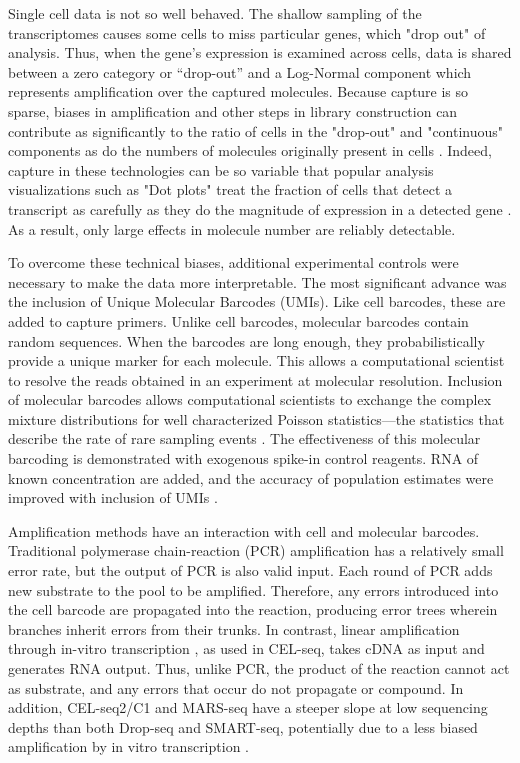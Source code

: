 Single cell data is not so well behaved.
The shallow sampling of the transcriptomes causes some cells to miss particular genes, which "drop out" of analysis. 
Thus, when the gene's expression is examined across cells, data is shared between a zero category or “drop-out” and a Log-Normal component which represents amplification over the captured molecules. 
Because capture is so sparse, biases in amplification and other steps in library construction can contribute as significantly to the ratio of cells in the "drop-out" and "continuous" components as do the numbers of molecules originally present in cells \citep{Zheng2011,Dohm2008}.
Indeed, capture in these technologies can be so variable that popular analysis visualizations such as "Dot plots" treat the fraction of cells that detect a transcript as carefully as they do the magnitude of expression in a detected gene \citep{Shekhar2016}. 
As a result, only large effects in molecule number are reliably detectable. 

To overcome these technical biases, additional experimental controls were necessary to make the data more interpretable. 
The most significant advance was the inclusion of Unique Molecular Barcodes (UMIs). 
Like cell barcodes, these are added to capture primers. 
Unlike cell barcodes, molecular barcodes contain random sequences. 
When the barcodes are long enough, they probabilistically provide a unique marker for each molecule. 
This allows a computational scientist to resolve the reads obtained in an experiment at molecular resolution. 
Inclusion of molecular barcodes allows computational scientists to exchange the complex mixture distributions for well characterized Poisson statistics---the statistics that describe the rate of rare sampling events \citep{Shiroguchi2012}.
The effectiveness of this molecular barcoding is demonstrated with exogenous spike-in control reagents. 
RNA of known concentration are added, and the accuracy of population estimates were improved with inclusion of UMIs \citep{Gruen2014}.

Amplification methods have an interaction with cell and molecular barcodes. 
Traditional polymerase chain-reaction (PCR) amplification has a relatively small error rate, but the output of PCR is also valid input. 
Each round of PCR adds new substrate to the pool to be amplified. 
Therefore, any errors introduced into the cell barcode are propagated into the reaction, producing error trees wherein branches inherit errors from their trunks. 
In contrast, linear amplification through in-vitro transcription \citep{Eberwine1992}, as used in CEL-seq, takes cDNA as input and generates RNA output. Thus, unlike PCR, the product of the reaction cannot act as substrate, and any errors that occur do not propagate or compound.
In addition, CEL-seq2/C1 and MARS-seq have a steeper slope at low sequencing depths than both Drop-seq and SMART-seq, potentially due to a less biased amplification by in vitro transcription \citep{Ziegenhain2017}.

